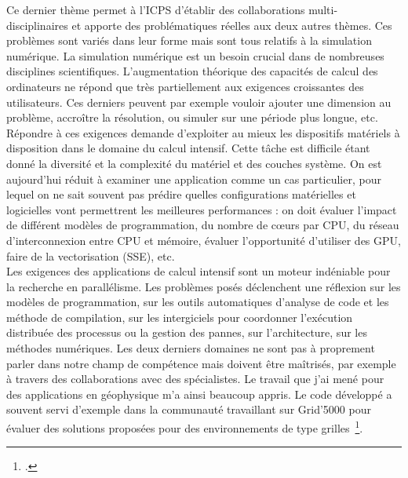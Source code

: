 \documentclass[11pt]{article}
\begin{document}
Ce dernier thème permet à l'ICPS d'établir des collaborations multi-%
disciplinaires et apporte des problématiques réelles aux deux autres 
thèmes. Ces problèmes sont variés dans leur forme mais sont tous
relatifs à la simulation numérique.
La simulation numérique est un besoin crucial dans de nombreuses 
disciplines scientifiques. L'augmentation théorique des capacités
de calcul des ordinateurs ne répond que très partiellement aux
exigences croissantes des utilisateurs. Ces derniers peuvent par
exemple vouloir ajouter une dimension au problème, accroître la 
résolution, ou simuler sur une période plus longue, etc. Répondre 
à ces exigences demande d'exploiter au mieux les dispositifs 
matériels à disposition dans le domaine du calcul intensif.
Cette tâche est difficile étant donné la diversité et la complexité
du matériel et des couches système. On est aujourd'hui réduit à examiner 
une application comme un cas particulier, pour lequel on ne sait souvent
pas prédire quelles configurations matérielles et logicielles vont 
permettrent les meilleures performances : on doit évaluer l'impact de
différent modèles de programmation, du nombre de c{\oe}urs par CPU,
du réseau d'interconnexion entre CPU et mémoire, évaluer l'opportunité
d'utiliser des GPU, faire de la vectorisation (SSE), etc.\\

Les exigences des applications de calcul intensif sont un moteur indéniable
pour la recherche en parallélisme. Les problèmes posés déclenchent une 
réflexion sur les modèles de programmation, sur les outils automatiques
d'analyse de code et les méthode de compilation, sur les intergiciels 
pour coordonner l'exécution distribuée des processus ou la gestion des pannes, 
sur l'architecture, sur les méthodes numériques. Les deux derniers domaines ne
 sont pas à proprement parler dans notre champ de compétence mais doivent
être maîtrisés, par exemple à travers des collaborations avec des 
spécialistes. Le travail que j'ai mené pour des applications en géophysique 
m'a ainsi beaucoup appris. Le code développé a souvent servi d'exemple dans
la communauté travaillant sur Grid'5000 pour évaluer des solutions proposées
pour des environnements de type grilles~\footcite{Cappello07}.  \\
\end{document}
